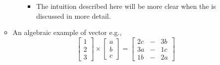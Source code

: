 \begin{itemize}
\begin{itemize}
\begin{itemize}
\begin{itemize}
        \item The intuition described here will be more clear when the \hyperref[tbd]{} is discussed in more detail.
      \end{itemize}
    \end{itemize}
    \item An algebraic example of vector e.g.,
    \[%
    \begin{bmatrix}
    1 \\
    2 \\
    3 
    \end{bmatrix}
    \times
    \begin{bmatrix}
    a \\
    b \\
    c 
    \end{bmatrix}
    =
    \begin{bmatrix}
    2c & - & 3b \\
    3a & - & 1c \\
    1b & - & 2a 
    \end{bmatrix}
    \]%
  \end{itemize}
  

\end{itemize}
